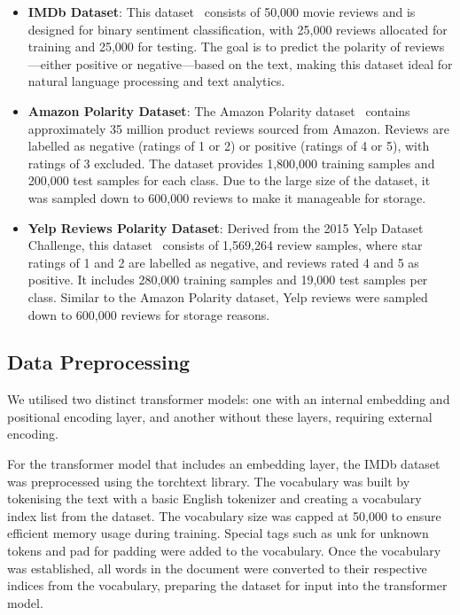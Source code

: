 \begin{itemize}
  \item \textbf{IMDb Dataset}:
        This dataset~\cite{imdb_dataset} consists of 50,000 movie reviews
        and is designed for
        binary sentiment classification, with 25,000 reviews allocated
        for training and 25,000 for testing. The goal is to predict the
        polarity of reviews—either positive or negative—based on the
        text, making this dataset ideal for natural language processing
        and text analytics.

  \item \textbf{Amazon Polarity Dataset}:
        The Amazon Polarity dataset~\citep{yelp_amazon_dataset} contains
        approximately 35 million
        product reviews sourced from Amazon. Reviews are labelled as
        negative (ratings of 1 or 2) or positive (ratings of 4 or 5),
        with ratings of 3 excluded. The dataset provides 1,800,000
        training samples and 200,000 test samples for each class. Due to
        the large size of the dataset, it was sampled down to 600,000
        reviews to make it manageable for storage.

  \item \textbf{Yelp Reviews Polarity Dataset}:
        Derived from the 2015 Yelp Dataset Challenge, this
        dataset~\citep{yelp_amazon_dataset}
        consists of 1,569,264 review samples, where star ratings of 1 and
        2 are labelled as negative, and reviews rated 4 and 5 as
        positive. It includes 280,000 training samples and 19,000 test
        samples per class. Similar to the Amazon Polarity dataset,
        Yelp reviews were sampled down to 600,000 reviews for storage reasons.
\end{itemize}

\subsection{Data Preprocessing}
\label{subsec:data_preprocessing}
We utilised two distinct transformer models: one with an internal
embedding and positional encoding layer, and another without these
layers, requiring external encoding.

For the transformer model that includes an embedding layer, the IMDb
dataset was preprocessed using the torchtext library. The vocabulary
was built by tokenising the text with a basic English tokenizer and
creating a vocabulary index list from the dataset. The vocabulary
size was capped at 50,000 to ensure efficient memory usage during
training. Special tags such as \textlangle unk\textrangle\xspace
for unknown tokens and \textlangle pad\textrangle\xspace for
padding were added to the vocabulary. Once the vocabulary was
established, all words in the document were converted to their
respective indices from the vocabulary, preparing the dataset for
input into the transformer model.

